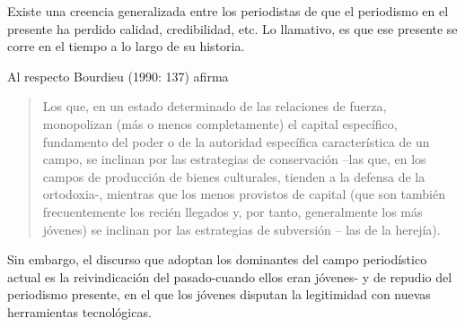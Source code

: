 {Existe una creencia generalizada entre los periodistas de que el periodismo en el presente ha perdido calidad, credibilidad, etc. Lo llamativo, es que ese presente se corre en el tiempo a lo largo de su historia.

Al respecto Bourdieu (1990: 137) afirma

\begin{quote}
Los que, en un estado determinado de las relaciones de fuerza, monopolizan (más o menos completamente) el capital específico, fundamento del poder o de la autoridad específica característica de un campo, se inclinan por las estrategias de conservación --las que, en los campos de producción de bienes culturales, tienden a la defensa de la ortodoxia-, mientras que los menos provistos de capital (que son también frecuentemente los recién llegados y, por tanto, generalmente los más jóvenes) se inclinan por las estrategias de subversión -- las de la herejía).
\end{quote}

Sin embargo, el discurso que adoptan los dominantes del campo periodístico actual es la reivindicación del pasado-cuando ellos eran jóvenes- y de repudio del periodismo presente, en el que los jóvenes disputan la legitimidad con nuevas herramientas tecnológicas.

}
